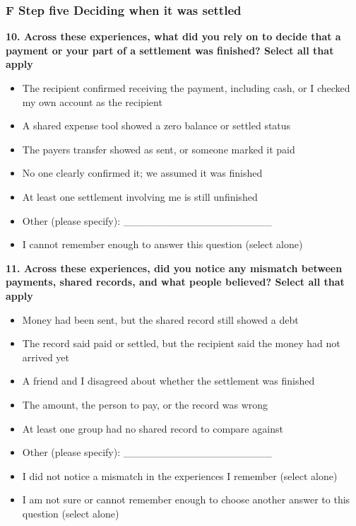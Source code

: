 \subsubsection*{F Step five Deciding when it was settled}

\par\smallskip\noindent\textbf{10. Across these experiences, what did you rely on to decide that a payment or your part of a settlement was finished? Select all that apply}\par\nobreak

\begin{itemize}
\item
  The recipient confirmed receiving the payment, including cash, or I checked my own account as the recipient
\item
  A shared expense tool showed a zero balance or settled status
\item
  The payer\textquotesingle s transfer showed as sent, or someone marked it paid
\item
  No one clearly confirmed it; we assumed it was finished
\item
  At least one settlement involving me is still unfinished
\item
  Other (please specify): \_\_\_\_\_\_\_\_\_\_\_\_\_\_\_\_\_\_\_\_
\item
  I cannot remember enough to answer this question (select alone)
\end{itemize}

\par\smallskip\noindent\textbf{11. Across these experiences, did you notice any mismatch between payments, shared records, and what people believed? Select all that apply}\par\nobreak

\begin{itemize}
\item
  Money had been sent, but the shared record still showed a debt
\item
  The record said paid or settled, but the recipient said the money had not arrived yet
\item
  A friend and I disagreed about whether the settlement was finished
\item
  The amount, the person to pay, or the record was wrong
\item
  At least one group had no shared record to compare against
\item
  Other (please specify): \_\_\_\_\_\_\_\_\_\_\_\_\_\_\_\_\_\_\_\_
\item
  I did not notice a mismatch in the experiences I remember (select alone)
\item
  I am not sure or cannot remember enough to choose another answer to this question (select alone)
\end{itemize}


